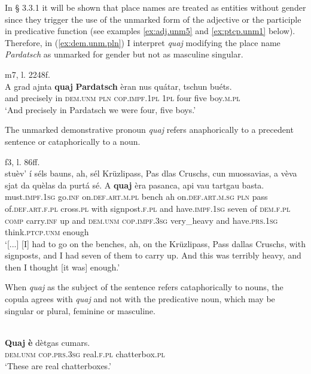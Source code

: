 In § 3.3.1 it will be shown that place names are treated as entities without gender since they trigger the use of the unmarked form of the adjective or the participle in predicative function (see examples \ref{ex:adj.unm5} and \ref{ex:ptcp.unm1} below). Therefore, in (\ref{ex:dem.unm.pln}) I interpret \textit{quaj} modifying the place name \textit{Pardatsch} as unmarked for gender but not as masculine singular.

\ea
\label{ex:dem.unm.pln}
 {m7, l. 2248f.}\\
	\gll A grad ajnta \textbf{quaj} \textbf{Pardatsch} èran nus quátar, tschun buéts.   \\
and precisely in \textsc{dem.unm} \textsc{pln} \textsc{cop.impf.1pl} \textsc{1pl} four five boy.\textsc{m.pl}\\
\glt `And precisely in Pardatsch we were four, five boys.'
\z


The unmarked demonstrative pronoun \textit{quaj} refers anaphorically to a precedent sentence or cataphorically to a noun.

\ea
\label{}
 {f3, l. 86ff.}\\
\gll [...] stuèv’ í  séls bauns, ah, sél Krüzlipass, Pas dlas Cruschs, cun muossavias, a vèva sjat da quèlas da purtá sé.  A \textbf{quaj} èra pasanca, api vau tartgau basta.  \\
{} must.\textsc{impf.1sg} go.\textsc{inf} on.\textsc{def.art.m.pl} bench ah on.\textsc{def.art.m.sg} \textsc{pln} pass of.\textsc{def.art.f.pl} cross.\textsc{pl} with signpost.\textsc{f.pl} and have.\textsc{impf.1sg} seven of  \textsc{dem.f.pl} \textsc{comp} carry.\textsc{inf} up and \textsc{dem.unm} \textsc{cop.impf.3sg} very\_heavy and have.\textsc{prs.1sg} think.\textsc{ptcp.unm} enough \\
\glt `[...] [I] had to go on the benches, ah, on the Krüzlipass, Pass dallas Cruschs, with signposts, and I had seven of them to carry up. And this was terribly heavy, and then I thought [it was] enough.'
\z

When \textit{quaj} as the subject of the sentence refers cataphorically to nouns, the copula agrees with \textit{quaj} and not with the predicative noun, which may be singular or plural, feminine or masculine.

\ea
\label{ex:quaj:agrwithsubj}
\\
\gll \textbf{Quaj} \textbf{è} dètgas cumars.\\
\textsc{dem.unm} \textsc{cop.prs.3sg} real.\textsc{f.pl} chatterbox.\textsc{pl}\\
\glt `These are real chatterboxes.'
\z

